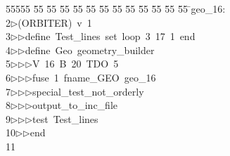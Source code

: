 %
%
\begin{tabbing}
55555 \= 55 \= 55 \= 55 \= 55 \= 55 \= 55 \= 55 \= 55 \= 55 \= 55 \= 55 \= 55 \= \>geo\_16:\\[0pt]
2\>$\triangleright$\>(ORBITER)\ v\ 1\ \\[0pt]
3\>$\triangleright$\>$\triangleright$\>define\ Test\_lines\ set\ loop\ 3\ 17\ 1\ end\ \\[0pt]
4\>$\triangleright$\>$\triangleright$\>define\ Geo\ geometry\_builder\ \\[0pt]
5\>$\triangleright$\>$\triangleright$\>$\triangleright$\>V\ 16\ B\ 20\ TDO\ 5\ \\[0pt]
6\>$\triangleright$\>$\triangleright$\>$\triangleright$\>fuse\ 1\ fname\_GEO\ geo\_16\ \\[0pt]
7\>$\triangleright$\>$\triangleright$\>$\triangleright$\>special\_test\_not\_orderly\ \\[0pt]
8\>$\triangleright$\>$\triangleright$\>$\triangleright$\>output\_to\_inc\_file\ \\[0pt]
9\>$\triangleright$\>$\triangleright$\>$\triangleright$\>test\ Test\_lines\ \\[0pt]
10\>$\triangleright$\>$\triangleright$\>end\\[0pt]
11\>\end{tabbing}
